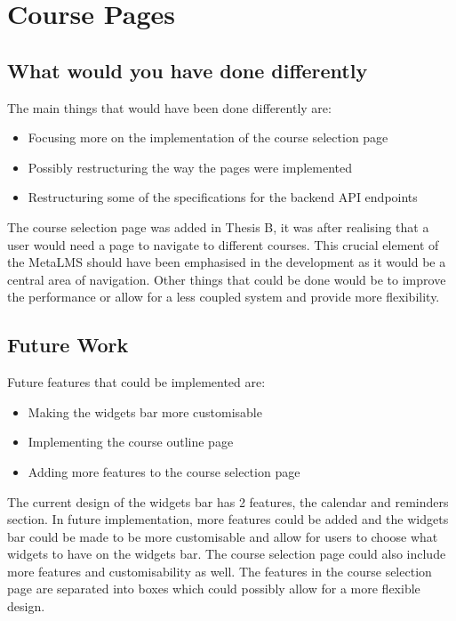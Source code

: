 \section{Course Pages}

\subsection{What would you have done differently}
The main things that would have been done differently are:
\begin{itemize}
    \item Focusing more on the implementation of the course selection page
    \item Possibly restructuring the way the pages were implemented
    \item Restructuring some of the specifications for the backend API endpoints
\end{itemize}
The course selection page was added in Thesis B, it was after realising that a user would need a page to navigate to different courses.
This crucial element of the MetaLMS should have been emphasised in the development as it would be a central area of navigation.
Other things that could be done would be to improve the performance or allow for a less coupled system and provide more flexibility.

\subsection{Future Work}
Future features that could be implemented are:
\begin{itemize}
    \item Making the widgets bar more customisable
    \item Implementing the course outline page
    \item Adding more features to the course selection page
\end{itemize}
The current design of the widgets bar has 2 features, the calendar and reminders section.
In future implementation, more features could be added and the widgets bar could be made to be more customisable and allow for users to choose what widgets to have on the widgets bar.
The course selection page could also include more features and customisability as well.
The features in the course selection page are separated into boxes which could possibly allow for a more flexible design.